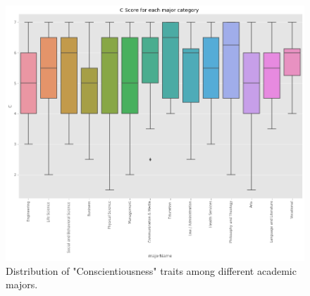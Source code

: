 \documentclass[conference]{IEEEtran}
\begin{document}
\begin{figure}[h]
\includegraphics[scale=0.25]{figs/score_c.png}
\caption{Distribution of "Conscientiousness" traits among different academic majors.}
\label{fig:score_c}
\centering
\end{figure}





\end{document}
